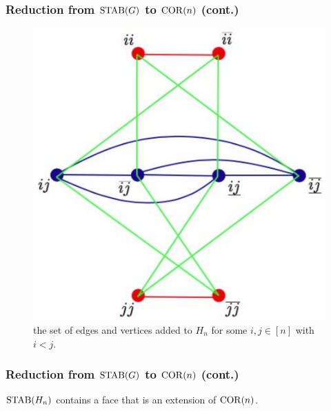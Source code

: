 \begin{frame}
\frametitle{Reduction from $\operatorname{STAB}(G)$ to $\operatorname{COR}(n)$ (cont.)}
\begin{figure}
\centering
\includegraphics[scale=0.35]{stable.pdf}
\caption{the set of edges and vertices added to $H_n$ for some $i,j \in [n]$ with $i < j$.}
\end{figure}
\end{frame}

\begin{frame}
\frametitle{Reduction from $\operatorname{STAB}(G)$ to $\operatorname{COR}(n)$ (cont.)}

\begin{lemma}
$\operatorname{STAB}(H_n)$ contains a face that is an extension of $\operatorname{COR}(n)$.
\end{lemma}
\end{frame}

